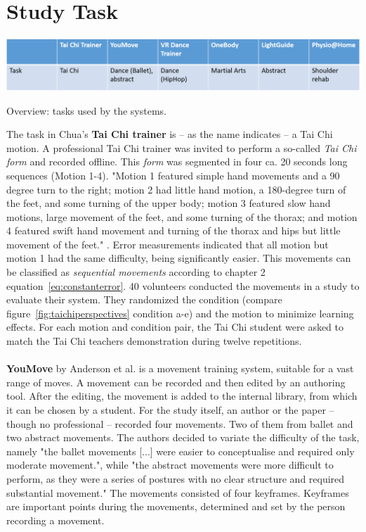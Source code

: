 \section{Study Task}
\begin{table}[h]
	\centering
	\includegraphics[width=1.0\textwidth]{img/tbl2.png}
	\caption{Overview: tasks used by the systems.}
	\label{fig:tbl2}
\end{table}
The task in Chua's \cite{Chua2003} \textbf{Tai Chi trainer} is \--- as the name indicates \--- a Tai Chi motion. A professional Tai Chi trainer was invited to perform a so-called \textit{Tai Chi form} and recorded offline. This \textit{form} was segmented in four ca. 20 seconds long sequences (Motion 1-4). "Motion 1 featured simple hand movements and a 90 degree turn to the right; motion 2 had little hand motion, a 180-degree turn of the feet, and some turning of the upper body; motion 3 featured slow hand motions, large movement of the feet, and some turning of the thorax; and motion 4 featured swift hand movement and turning of the thorax and hips but little movement of the feet." \cite{Chua2003}. Error measurements indicated that all motion but motion 1 had the same difficulty, being significantly easier. This movements can be classified as \textit{sequential movements} according to chapter 2 equation~\ref{eq:constanterror}. 40 volunteers conducted the movements in a study to evaluate their system. They randomized the condition (compare figure~\ref{fig:taichiperspectives} condition a-e) and the motion to minimize learning effects. For each motion and condition pair, the Tai Chi student were asked to match the Tai Chi teachers demonstration during twelve repetitions.\\ \\
\textbf{YouMove} by Anderson et al. \cite{Anderson2013a} is a movement training system, suitable for a vast range of moves. A movement can be recorded and then edited by an authoring tool. After the editing, the movement is added to the internal library, from which it can be chosen by a student. For the study itself, an author or the paper \--- though no professional \--- recorded four movements. Two of them from ballet and two abstract movements. The authors decided to variate the difficulty of the task, namely "the ballet movements [...] were easier to conceptualise and required only moderate movement.", while "the abstract movements were more difficult to perform, as they were a series of postures with no clear structure and required substantial movement." The movements consisted of four keyframes. Keyframes are important points during the movements, determined and set by the person recording a movement.\\ \\
